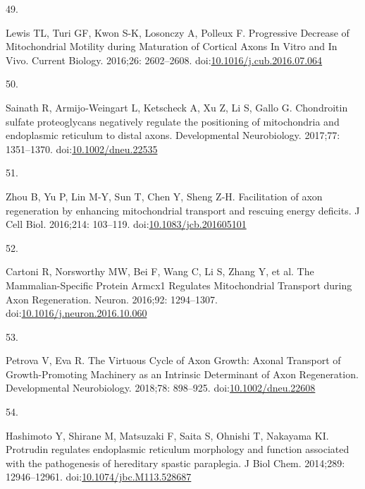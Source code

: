 \documentclass[
  12pt,
  a4paper,
]{book}
\newlength{\cslhangindent}
\newlength{\csllabelwidth}
\newenvironment{CSLReferences}[2] %
 {\begin{list}{}{%
  \setlength{\itemindent}{0pt}
  \setlength{\leftmargin}{0pt}
  \setlength{\parsep}{0pt}
  \ifodd #1
   \setlength{\leftmargin}{\cslhangindent}
   \setlength{\itemindent}{-1\cslhangindent}
  \fi
  \setlength{\itemsep}{#2\baselineskip}}}
 {\end{list}}
\newcommand{\CSLLeftMargin}[1]{\parbox[t]{\csllabelwidth}{\strut#1\strut}}
\newcommand{\CSLRightInline}[1]{\parbox[t]{\linewidth - \csllabelwidth}{\strut#1\strut}}
\begin{document}
\begin{CSLReferences}{0}{1}
\CSLLeftMargin{49. }%
\CSLRightInline{Lewis TL, Turi GF, Kwon S-K, Losonczy A, Polleux F. Progressive {Decrease} of {Mitochondrial Motility} during {Maturation} of {Cortical Axons In Vitro} and {In Vivo}. Current Biology. 2016;26: 2602--2608. doi:\href{https://doi.org/10.1016/j.cub.2016.07.064}{10.1016/j.cub.2016.07.064}}

\CSLLeftMargin{50. }%
\CSLRightInline{Sainath R, Armijo‐Weingart L, Ketscheck A, Xu Z, Li S, Gallo G. Chondroitin sulfate proteoglycans negatively regulate the positioning of mitochondria and endoplasmic reticulum to distal axons. Developmental Neurobiology. 2017;77: 1351--1370. doi:\href{https://doi.org/10.1002/dneu.22535}{10.1002/dneu.22535}}

\CSLLeftMargin{51. }%
\CSLRightInline{Zhou B, Yu P, Lin M-Y, Sun T, Chen Y, Sheng Z-H. Facilitation of axon regeneration by enhancing mitochondrial transport and rescuing energy deficits. J Cell Biol. 2016;214: 103--119. doi:\href{https://doi.org/10.1083/jcb.201605101}{10.1083/jcb.201605101}}

\CSLLeftMargin{52. }%
\CSLRightInline{Cartoni R, Norsworthy MW, Bei F, Wang C, Li S, Zhang Y, et al. The {Mammalian-Specific Protein Armcx1 Regulates Mitochondrial Transport} during {Axon Regeneration}. Neuron. 2016;92: 1294--1307. doi:\href{https://doi.org/10.1016/j.neuron.2016.10.060}{10.1016/j.neuron.2016.10.060}}

\CSLLeftMargin{53. }%
\CSLRightInline{Petrova V, Eva R. The {Virtuous Cycle} of {Axon Growth}: {Axonal Transport} of {Growth-Promoting Machinery} as an {Intrinsic Determinant} of {Axon Regeneration}. Developmental Neurobiology. 2018;78: 898--925. doi:\href{https://doi.org/10.1002/dneu.22608}{10.1002/dneu.22608}}

\CSLLeftMargin{54. }%
\CSLRightInline{Hashimoto Y, Shirane M, Matsuzaki F, Saita S, Ohnishi T, Nakayama KI. Protrudin regulates endoplasmic reticulum morphology and function associated with the pathogenesis of hereditary spastic paraplegia. J Biol Chem. 2014;289: 12946--12961. doi:\href{https://doi.org/10.1074/jbc.M113.528687}{10.1074/jbc.M113.528687}}


\end{CSLReferences}
\end{document}

